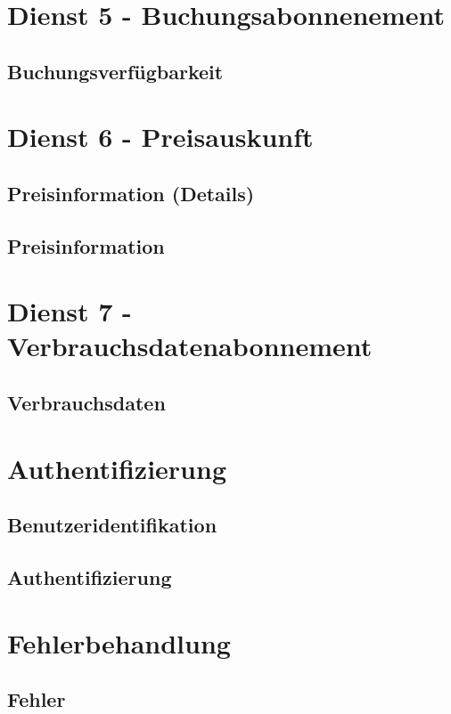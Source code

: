 \section{Dienst 5 - Buchungsabonnenement}
\label{sec:Datenmodell:Dienst5}

\subsection*{Buchungsverfügbarkeit}



\section{Dienst 6 - Preisauskunft}
\label{sec:Datenmodell:Dienst6}

\subsection*{Preisinformation (Details)}



\subsection*{Preisinformation}



\section{Dienst 7 - Verbrauchsdatenabonnement}
\label{sec:Datenmodell:Dienst7}

\subsection*{Verbrauchsdaten}



\section{Authentifizierung}
\label{sec:Datenmodell:Auth}

\subsection*{Benutzeridentifikation}



\subsection*{Authentifizierung}




\section{Fehlerbehandlung}
\subsection*{Fehler}


